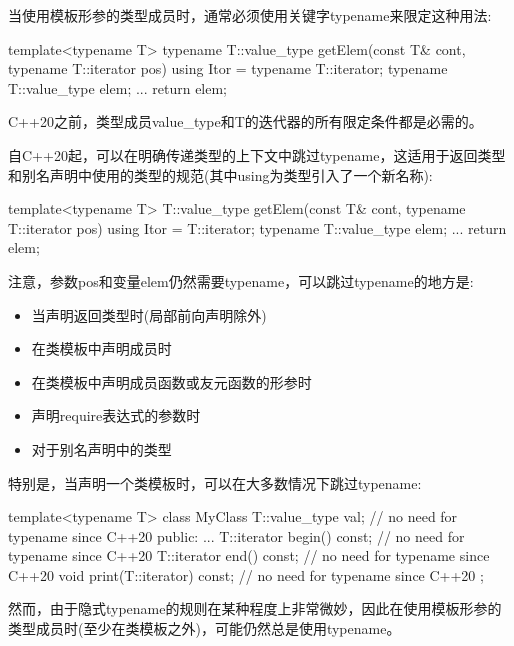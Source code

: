 
当使用模板形参的类型成员时，通常必须使用关键字typename来限定这种用法:

\begin{cpp}
template<typename T>
typename T::value_type getElem(const T& cont, typename T::iterator pos)
{
	using Itor = typename T::iterator;
	typename T::value_type elem;
	...
	return elem;
}
\end{cpp}

C++20之前，类型成员value\_type和T的迭代器的所有限定条件都是必需的。

自C++20起，可以在明确传递类型的上下文中跳过typename，这适用于返回类型和别名声明中使用的类型的规范(其中using为类型引入了一个新名称):

\begin{cpp}
template<typename T>
T::value_type getElem(const T& cont, typename T::iterator pos)
{
	using Itor = T::iterator;
	typename T::value_type elem;
	...
	return elem;
}
\end{cpp}

注意，参数pos和变量elem仍然需要typename，可以跳过typename的地方是:

\begin{itemize}
\item 
当声明返回类型时(局部前向声明除外)

\item 
在类模板中声明成员时

\item 
在类模板中声明成员函数或友元函数的形参时

\item 
声明require表达式的参数时

\item 
对于别名声明中的类型
\end{itemize}

特别是，当声明一个类模板时，可以在大多数情况下跳过typename:

\begin{cpp}
template<typename T>
class MyClass {
	T::value_type val; // no need for typename since C++20
public:
	...
	T::iterator begin() const; // no need for typename since C++20
	T::iterator end() const; // no need for typename since C++20
	void print(T::iterator) const; // no need for typename since C++20
};
\end{cpp}

然而，由于隐式typename的规则在某种程度上非常微妙，因此在使用模板形参的类型成员时(至少在类模板之外)，可能仍然总是使用typename。



